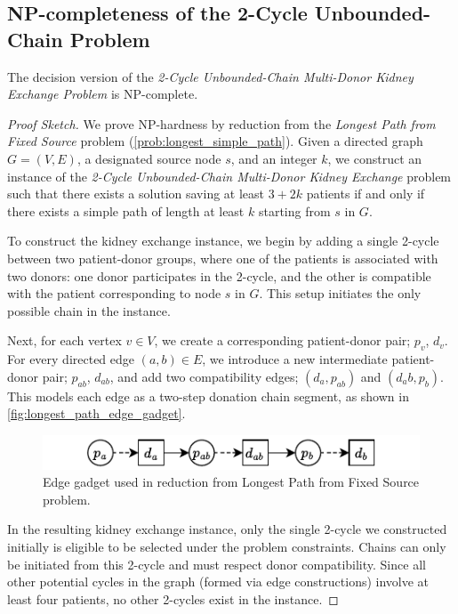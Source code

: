 \subsection{NP-completeness of the 2-Cycle Unbounded-Chain Problem}

\begin{lemma}
The decision version of the \textit{2-Cycle Unbounded-Chain Multi-Donor Kidney Exchange Problem} is NP-complete.
\end{lemma}

\begin{proof}[Proof Sketch]
We prove NP-hardness by reduction from the \textit{Longest Path from Fixed Source} problem (\autoref{prob:longest_simple_path}). Given a directed graph $G = (V, E)$, a designated source node $s$, and an integer $k$, we construct an instance of the \textit{2-Cycle Unbounded-Chain Multi-Donor Kidney Exchange} problem such that there exists a solution saving at least $3 + 2k$ patients if and only if there exists a simple path of length at least $k$ starting from $s$ in $G$.

To construct the kidney exchange instance, we begin by adding a single 2-cycle between two patient-donor groups, where one of the patients is associated with two donors: one donor participates in the 2-cycle, and the other is compatible with the patient corresponding to node $s$ in $G$. This setup initiates the only possible chain in the instance.

Next, for each vertex $v \in V$, we create a corresponding patient-donor pair; $p_v$, $d_v$. For every directed edge $(a, b) \in E$, we introduce a new intermediate patient-donor pair; $p_{ab}$, $d_{ab}$, and add two compatibility edges; $(d_a, p_{ab})$ and $(d_ab, p_b)$. This models each edge as a two-step donation chain segment, as shown in \autoref{fig:longest_path_edge_gadget}.


\begin{figure}
    \centering
    \includegraphics{data/longest_path_edge_gadget.pdf}
    \caption[Edge gadget used in reduction from Longest Path from Fixed Source problem.]{Edge gadget used in reduction from Longest Path from Fixed Source problem.}
    \label{fig:longest_path_edge_gadget}
\end{figure}


In the resulting kidney exchange instance, only the single 2-cycle we constructed initially is eligible to be selected under the problem constraints. Chains can only be initiated from this 2-cycle and must respect donor compatibility. Since all other potential cycles in the graph (formed via edge constructions) involve at least four patients, no other 2-cycles exist in the instance.


\end{proof}
